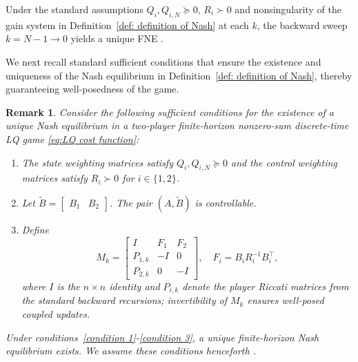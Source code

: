 \documentclass[letterpaper, 10 pt, conference]{ieeeconf}  %
\newtheorem{definition}{\textbf{Definition}}
\newtheorem{remark}{\textbf{Remark}}
\begin{document}
Under the standard assumptions $Q_i,Q_{i,N}\succeq 0$, $R_i\succ 0$ and nonsingularity of the gain system  in Definition~\ref{def: definition of Nash} at each $k$, the backward sweep $k=N-1\to 0$ yields a unique FNE \cite[Sec.~6]{Engwerda2009lq}.



We next recall standard sufficient conditions that ensure the existence and uniqueness of the Nash equilibrium in Definition~\ref{def: definition of Nash}, thereby guaranteeing well-posedness of the game.

\begin{remark}
Consider the following sufficient conditions for the existence of a unique Nash equilibrium in a two-player finite-horizon nonzero-sum discrete-time LQ game \eqref{eq:LQ cost function}:
\begin{enumerate}
    \item The state weighting matrices satisfy $Q_{i}, Q_{i,N} \succeq 0$ and the control weighting matrices satisfy $R_{i} \succ 0$ for $i \in \{1,2\}$.\label{condition 1}
    \item Let $\tilde{B} = \begin{bmatrix} B_1 & B_2 \end{bmatrix}$. The pair $(A, \tilde{B})$ is controllable.\label{condition 2}
    \item Define
    \[
    M_{k} =
    \begin{bmatrix}
    I & F_1 & F_2 \\
    P_{1,k} & -I & 0 \\
    P_{2,k} & 0 & -I
    \end{bmatrix},
    \quad F_i = B_i R_{i}^{-1} B_i^\top,
    \]
    where $I$ is the $n\times n$ identity and $P_{i,k}$ denote the player Riccati matrices from the standard backward recursions; invertibility of $M_k$ ensures well-posed coupled updates.\label{condition 3}
\end{enumerate}
Under conditions~\ref{condition 1}-\ref{condition 3}, a unique finite-horizon Nash equilibrium exists. We assume these conditions henceforth \cite{LAA_Jungers_2013}.
\end{remark}
\end{document}
